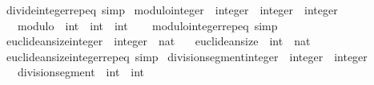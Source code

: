 \begin{isabellebody}
\isamarkupfalse%
\ divide{\isacharunderscore}{\kern0pt}integer{\isachardot}{\kern0pt}rep{\isacharunderscore}{\kern0pt}eq\ {\isacharbrackleft}{\kern0pt}simp{\isacharbrackright}{\kern0pt}\isanewline
\isanewline
{}\isamarkupfalse%
\ modulo{\isacharunderscore}{\kern0pt}integer\ {\isacharcolon}{\kern0pt}{\isacharcolon}{\kern0pt}\ {\isachardoublequoteopen}integer\ {\isasymRightarrow}\ integer\ {\isasymRightarrow}\ integer{\isachardoublequoteclose}\isanewline
\ \ \ {\isachardoublequoteopen}modulo\ {\isacharcolon}{\kern0pt}{\isacharcolon}{\kern0pt}\ int\ {\isasymRightarrow}\ int\ {\isasymRightarrow}\ int{\isachardoublequoteclose}\isanewline
%
\isadelimproof
\ \ %
\endisadelimproof
%
\isatagproof
\isacommand{{\isachardot}{\kern0pt}}\isamarkupfalse%
%
\endisatagproof
{\isafoldproof}%
%
\isadelimproof
\isanewline
%
\endisadelimproof
\isanewline
{}\isamarkupfalse%
\ modulo{\isacharunderscore}{\kern0pt}integer{\isachardot}{\kern0pt}rep{\isacharunderscore}{\kern0pt}eq\ {\isacharbrackleft}{\kern0pt}simp{\isacharbrackright}{\kern0pt}\isanewline
\isanewline
{}\isamarkupfalse%
\ euclidean{\isacharunderscore}{\kern0pt}size{\isacharunderscore}{\kern0pt}integer\ {\isacharcolon}{\kern0pt}{\isacharcolon}{\kern0pt}\ {\isachardoublequoteopen}integer\ {\isasymRightarrow}\ nat{\isachardoublequoteclose}\isanewline
\ \ \ {\isachardoublequoteopen}euclidean{\isacharunderscore}{\kern0pt}size\ {\isacharcolon}{\kern0pt}{\isacharcolon}{\kern0pt}\ int\ {\isasymRightarrow}\ nat{\isachardoublequoteclose}\isanewline
%
\isadelimproof
\ \ %
\endisadelimproof
%
\isatagproof
\isacommand{{\isachardot}{\kern0pt}}\isamarkupfalse%
%
\endisatagproof
{\isafoldproof}%
%
\isadelimproof
\isanewline
%
\endisadelimproof
\isanewline
{}\isamarkupfalse%
\ euclidean{\isacharunderscore}{\kern0pt}size{\isacharunderscore}{\kern0pt}integer{\isachardot}{\kern0pt}rep{\isacharunderscore}{\kern0pt}eq\ {\isacharbrackleft}{\kern0pt}simp{\isacharbrackright}{\kern0pt}\isanewline
\isanewline
{}\isamarkupfalse%
\ division{\isacharunderscore}{\kern0pt}segment{\isacharunderscore}{\kern0pt}integer\ {\isacharcolon}{\kern0pt}{\isacharcolon}{\kern0pt}\ {\isachardoublequoteopen}integer\ {\isasymRightarrow}\ integer{\isachardoublequoteclose}\isanewline
\ \ \ {\isachardoublequoteopen}division{\isacharunderscore}{\kern0pt}segment\ {\isacharcolon}{\kern0pt}{\isacharcolon}{\kern0pt}\ int\ {\isasymRightarrow}\ int{\isachardoublequoteclose}\isanewline

\end{isabellebody}
